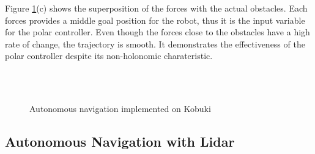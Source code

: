 \documentclass[conference]{IEEEtran}
\begin{document}
Figure \ref{f:kbki}(c) shows the superposition of the forces with the actual obstacles. Each forces provides a middle goal position for the robot, thus it is the input variable for the polar controller. Even though the forces close to the obstacles have a high rate of change, the trajectory is smooth. It demonstrates the effectiveness of the polar controller despite its non-holonomic charateristic. 
\begin{figure}
	\centering
	\\
	\\
	\caption{Autonomous navigation implemented on Kobuki} \label{f:kbki}
\end{figure}

\subsection{Autonomous Navigation with Lidar}
\end{document}
